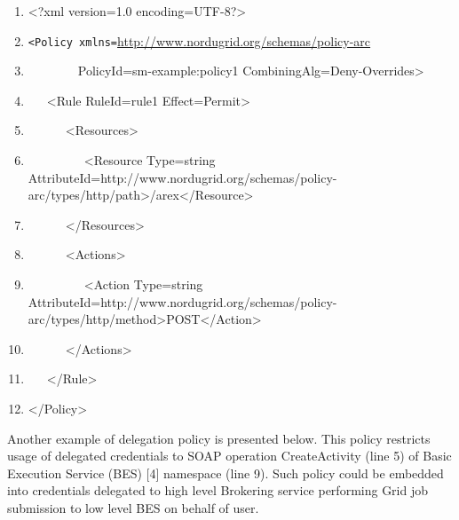 \documentclass{article}
\newcommand\liststyleWWviiiNumxv{%
\renewcommand\theenumi{\arabic{enumi}}
\renewcommand\theenumii{\arabic{enumii}}
\renewcommand\theenumiii{\arabic{enumiii}}
\renewcommand\theenumiv{\arabic{enumiv}}
\renewcommand\labelenumi{\theenumi.}
\renewcommand\labelenumii{\theenumii.}
\renewcommand\labelenumiii{\theenumiii.}
\renewcommand\labelenumiv{\theenumiv.}
}
\begin{document}
\liststyleWWviiiNumxv
\begin{enumerate}
\item {\ttfamily\color{black}
{\textless}?xml version={\textquotedbl}1.0{\textquotedbl}
encoding={\textquotedbl}UTF-8{\textquotedbl}?{\textgreater}}
\item {\color{black}
\texttt{{\textless}Policy
xmlns={\textquotedbl}}\url{http://www.nordugrid.org/schemas/policy-arc}\texttt{{\textquotedbl}}}
\item {\ttfamily\color{black}
\ \ \ \ \ \ \ \ PolicyId={\textquotedbl}sm-example:policy1{\textquotedbl}
CombiningAlg={\textquotedbl}Deny-Overrides{\textquotedbl}{\textgreater}}
\item {\ttfamily\color{black}
\ \ \ {\textless}Rule RuleId={\textquotedbl}rule1{\textquotedbl}
Effect={\textquotedbl}Permit{\textquotedbl}{\textgreater}}
\item {\ttfamily\color{black}
\ \ \ \ \ \ {\textless}Resources{\textgreater}}
\item {\ttfamily\color{black}
\ \ \ \ \ \ \ \ \ {\textless}Resource
Type={\textquotedbl}string{\textquotedbl}
AttributeId={\textquotedbl}http://www.nordugrid.org/schemas/policy-arc/types/http/path{\textquotedbl}{\textgreater}/arex{\textless}/Resource{\textgreater}}
\item {\ttfamily\color{black}
\ \ \ \ \ \ {\textless}/Resources{\textgreater}}
\item {\ttfamily\color{black}
\ \ \ \ \ \ {\textless}Actions{\textgreater}}
\item {\ttfamily\color{black}
\ \ \ \ \ \ \ \ \ {\textless}Action
Type={\textquotedbl}string{\textquotedbl}
AttributeId={\textquotedbl}http://www.nordugrid.org/schemas/policy-arc/types/http/method{\textquotedbl}{\textgreater}POST{\textless}/Action{\textgreater}}
\item {\ttfamily\color{black}
\ \ \ \ \ \ {\textless}/Actions{\textgreater}}
\item {\ttfamily\color{black}
\ \ \ {\textless}/Rule{\textgreater}}
\item {\ttfamily\color{black}
{\textless}/Policy{\textgreater}}
\end{enumerate}
{\color{black}
Another example of delegation policy is presented below. This policy
restricts usage of delegated credentials to SOAP operation
CreateActivity (line 5) of Basic Execution Service (BES) [4] namespace
(line 9). Such policy could be embedded into credentials delegated to
high level Brokering service performing Grid job submission to low
level BES on behalf of user.}
\end{document}
